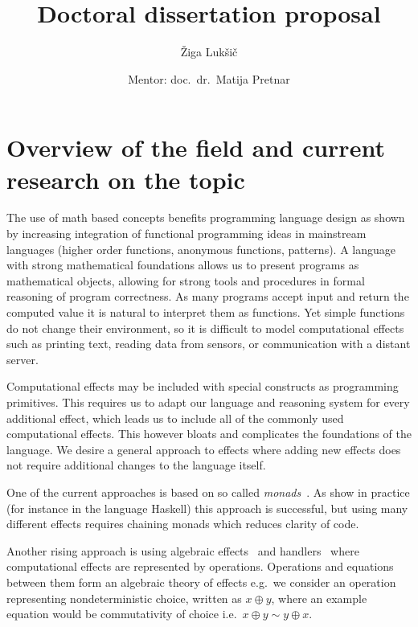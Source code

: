 \documentclass{article}
\title{Doctoral dissertation proposal}
\author{Žiga Lukšič \and Mentor: doc.\ dr.\ Matija Pretnar}
\date{}
\newcommand{\todo}[1]{{\color{red}{#1}}}
\begin{document}
\maketitle

\vspace{-10mm}
\begin{center}
  \Large{\textsc{\textbf{\todo{???}}}}

  \Large{\textsc{\textbf{\todo{??? but in english}}}}
\end{center}

\section*{Overview of the field and current research on the topic}

The use of math based concepts benefits programming language design as shown by increasing integration of functional programming ideas in mainstream languages (higher order functions, anonymous functions, patterns). A language with strong mathematical foundations allows us to present programs as mathematical objects, allowing for strong tools and procedures in formal reasoning of program correctness. As many programs accept input and return the computed value it is natural to interpret them as functions. Yet simple functions do not change their environment, so it is difficult to model computational effects such as printing text, reading data from sensors, or communication with a distant server.

Computational effects may be included with special constructs as programming primitives. This requires us to adapt our language and reasoning system for every additional effect, which leads us to include all of the commonly used computational effects. This however bloats and complicates the foundations of the language. We desire a general approach to effects where adding new effects does not require additional changes to the language itself.

One of the current approaches is based on so called \emph{monads}~\cite{DBLP:journals/iandc/Moggi91}. As show in practice (for instance in the language Haskell) this approach is successful, but using many different effects requires chaining monads which reduces clarity of code.

Another rising approach is using algebraic effects~\cite{DBLP:conf/fossacs/PlotkinP01,DBLP:journals/acs/PlotkinP03} and handlers~\cite{DBLP:conf/esop/PlotkinP09} where computational effects are represented by operations. Operations and equations between them form an algebraic theory of effects e.g.\ we consider an operation representing nondeterministic choice, written as $x \oplus y$, where an example equation would be commutativity of choice i.e.\ $x  \oplus y \sim y \oplus x$.
\end{document}
